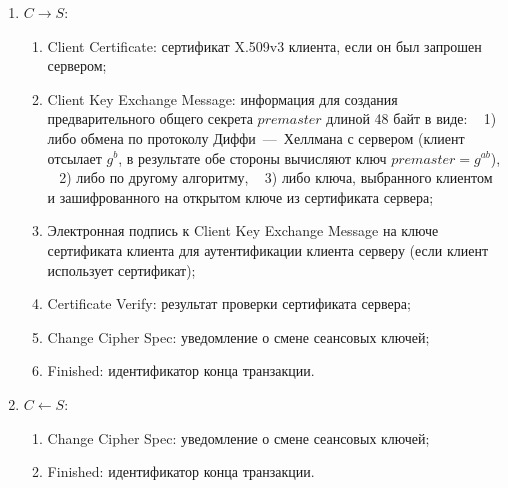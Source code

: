 \begin{enumerate}
    \item $C \rightarrow S$:
        \begin{enumerate}
            \item Client Certificate: сертификат X.509v3 клиента, если он был запрошен сервером;
            \item Client Key Exchange Message: информация для создания предварительного общего секрета $premaster$ длиной 48 байт в виде: ~ 1) либо обмена по протоколу Диффи~---~Хеллмана с сервером (клиент отсылает $g^b$, в результате обе стороны вычисляют ключ $premaster = g^{ab}$), ~ 2) либо по другому алгоритму, ~ 3) либо ключа, выбранного клиентом и зашифрованного на открытом ключе из сертификата сервера;
            \item Электронная подпись к Client Key Exchange Message на ключе сертификата клиента для аутентификации клиента серверу (если клиент использует сертификат);
            \item Certificate Verify: результат проверки сертификата сервера;
            \item Change Cipher Spec: уведомление о смене сеансовых ключей;
            \item Finished: идентификатор конца транзакции.
        \end{enumerate}

    \item $C \leftarrow S$:
        \begin{enumerate}
            \item Change Cipher Spec: уведомление о смене сеансовых ключей;
            \item Finished: идентификатор конца транзакции.
        \end{enumerate}
\end{enumerate}




